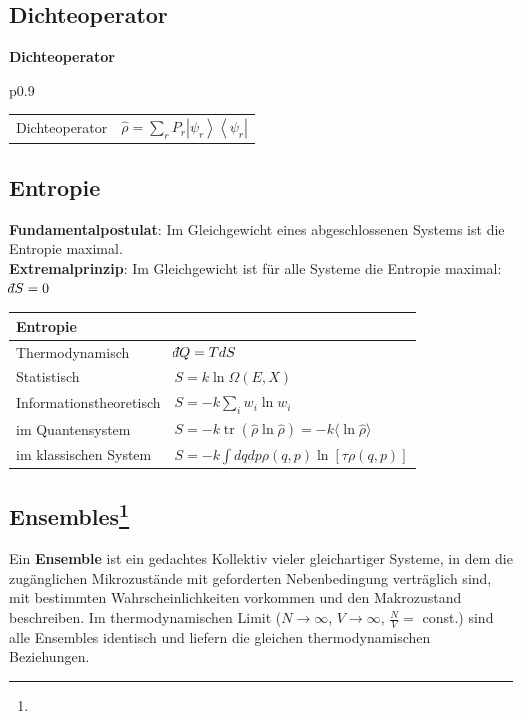 \documentclass[12pt,a4paper, twoside]{article}
\makeatletter
\DeclareMathOperator{\tr}{tr}
\newcommand{\ket}[1]{\left| #1 \right>}
\newcommand{\bra}[1]{\left< #1 \right|}
\renewcommand{\=}[1]{\stackrel{#1}{=}}
\def\dbar{{\mathchar'26\mkern-12mu d}}
\def\dbar{{\mathchar'26\mkern-12mu d}}
\theoremstyle{definition}
\theoremstyle{remark}
\newcommand{\concept}[2]{%
\noindent
\begin{framed}
\noindent\textbf{#1}
\par\begin{tabular}{p{0.9\linewidth}}
#2
\end{tabular}
\end{framed}
}
\newcommand{\f}[2]{%
\noindent\begin{tabularx}{\linewidth}{@{}p{5cm}X}
#1 & $#2$
\end{tabularx}}
\makeatother
\begin{document}
\subsection{Dichteoperator}

\concept{Dichteoperator}{
\f{Dichteoperator}{\hat \rho = \sum_r P_r \ket{\psi_r}\bra{\psi_r}}
}

\subsection{Entropie}

\textbf{Fundamentalpostulat}: Im Gleichgewicht eines abgeschlossenen Systems ist die Entropie maximal.\\
\textbf{Extremalprinzip}: Im Gleichgewicht ist für alle Systeme die Entropie maximal: $\dbar S = 0$

\begin{center}
\begin{framed}
	\begin{tabular}{ll}
	Entropie & \\
	\midrule
	Thermodynamisch & $\dbar Q = T dS$\\
	Statistisch & $S = k \ln \Omega(E, X)$\\
	Informationstheoretisch & $S = - k \sum_i w_i \ln w_i$\\
	\midrule
	im Quantensystem & $S = -k \tr(\hat \rho \ln \hat \rho) = -k \langle \ln \hat \rho \rangle$\\
	im klassischen System & $S = -k \int dq dp \rho(q, p) \ln [\tau \rho(q, p)]$\\
	\bottomrule
	\end{tabular}
\end{framed}
\end{center}

\subsection[Ensembles]{Ensembles\let\thefootnote\relax\footnote{}}

Ein \textbf{Ensemble} ist ein gedachtes Kollektiv vieler gleichartiger Systeme, in dem die zugänglichen Mikrozustände mit geforderten Nebenbedingung verträglich sind, mit bestimmten Wahrscheinlichkeiten vorkommen und den Makrozustand beschreiben. Im thermodynamischen Limit ($N \longrightarrow \infty$, $V \longrightarrow \infty$, $\frac{N}{V} = $ const.) sind alle Ensembles identisch und liefern die gleichen thermodynamischen Beziehungen.\\
\end{document}

